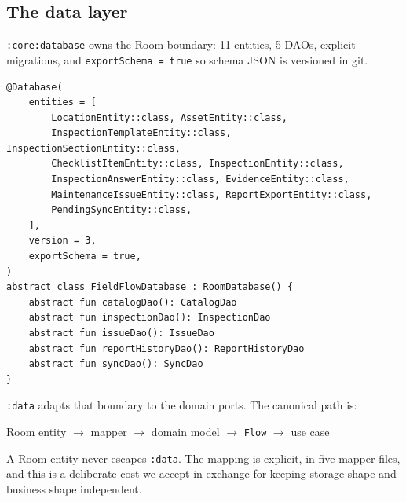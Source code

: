 \documentclass[11pt,a4paper]{article}
\newcommand{\mdl}[1]{\texttt{#1}}
\newcommand{\file}[1]{{\small\texttt{#1}}}
\begin{document}
\subsection{The data layer}

\mdl{:core:database} owns the Room boundary: 11 entities, 5 DAOs, explicit
migrations, and \texttt{exportSchema = true} so schema JSON is versioned in git.

\begin{lstlisting}[caption={\file{core/database/.../FieldFlowDatabase.kt} (abridged).}]
@Database(
    entities = [
        LocationEntity::class, AssetEntity::class,
        InspectionTemplateEntity::class, InspectionSectionEntity::class,
        ChecklistItemEntity::class, InspectionEntity::class,
        InspectionAnswerEntity::class, EvidenceEntity::class,
        MaintenanceIssueEntity::class, ReportExportEntity::class,
        PendingSyncEntity::class,
    ],
    version = 3,
    exportSchema = true,
)
abstract class FieldFlowDatabase : RoomDatabase() {
    abstract fun catalogDao(): CatalogDao
    abstract fun inspectionDao(): InspectionDao
    abstract fun issueDao(): IssueDao
    abstract fun reportHistoryDao(): ReportHistoryDao
    abstract fun syncDao(): SyncDao
}
\end{lstlisting}

\mdl{:data} adapts that boundary to the domain ports. The canonical path is:

\begin{center}
Room entity $\rightarrow$ mapper $\rightarrow$ domain model $\rightarrow$
\texttt{Flow} $\rightarrow$ use case
\end{center}

A Room entity never escapes \mdl{:data}. The mapping is explicit, in five mapper
files, and this is a deliberate cost we accept in exchange for keeping storage
shape and business shape independent.
\end{document}
